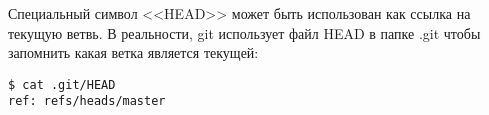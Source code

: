 \documentclass[a4paper, 12pt]{report}
\begin{document}
Специальный символ <<HEAD>> может быть использован как ссылка на текущую ветвь.
В реальности, git использует файл HEAD в папке .git чтобы запомнить какая ветка
является текущей:

\begin{lstlisting}
$ cat .git/HEAD
ref: refs/heads/master
\end{lstlisting}
%
%
\end{document}

